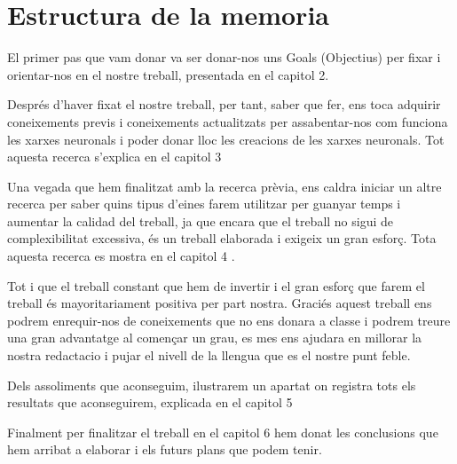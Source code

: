 \section{Estructura de la memoria}

El primer pas que vam donar va ser donar-nos uns Goals (Objectius) per fixar i orientar-nos en el nostre treball, presentada en el capitol 2.

Després d'haver fixat el nostre treball, per tant, saber que fer, ens toca adquirir coneixements previs i coneixements actualitzats per assabentar-nos com funciona les xarxes neuronals i poder donar lloc les creacions de les xarxes neuronals. Tot aquesta recerca s'explica en el capitol 3 

Una vegada que hem finalitzat amb la recerca prèvia, ens caldra iniciar un altre recerca per saber quins tipus d'eines farem utilitzar per guanyar temps i aumentar la calidad del treball, ja que encara que el treball no sigui de complexibilitat excessiva, és un treball elaborada i exigeix un gran esforç. Tota aquesta recerca es mostra en el capitol 4 .

Tot i que el treball constant que hem de invertir i el gran esforç que farem el treball és mayoritariament positiva per part nostra. Graciés  aquest treball ens podrem enrequir-nos de coneixements que no ens donara a classe i podrem treure una gran advantatge al començar un grau, es mes ens ajudara en millorar la nostra redactacio i pujar el nivell de la llengua que es el nostre punt feble.

Dels assoliments que aconseguim, ilustrarem un apartat on registra tots els resultats que aconseguirem, explicada en el capitol 5 

Finalment per finalitzar el treball en el capitol 6  hem donat les conclusions que hem arribat a elaborar i els futurs plans que podem tenir.



